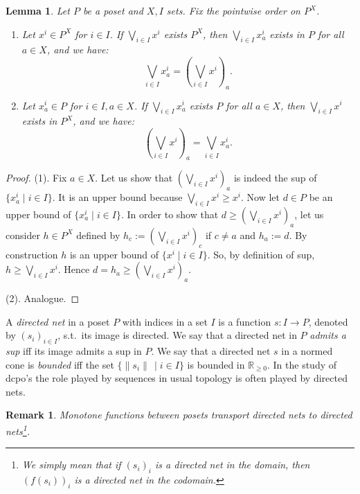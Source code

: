\documentclass[submission,copyright,creativecommons]{eptcs}
\newtheorem{Lemma}[theorem]{Lemma}
\newtheorem{Remark}[theorem]{Remark}
\newcommand{\R}{\mathbb{R}}
\newcommand{\set}[1]{\{#1\}}
\newcommand{\norm}[1]{\lVert #1 \lVert}
\begin{document}
\begin{Lemma}\label{lm:sup=sup}
 Let $P$ be a poset and $X, I$ sets. Fix the pointwise order on $P^X$.
 \begin{enumerate}
  \item Let $x^i\in P^X$ for $i\in I$.
  If $\bigvee\limits_{i\in I} x^i$ exists $P^X$, then $\bigvee\limits_{i\in I} x^i_a$ exists in $P$ for all $a\in X$, and we have: \[\bigvee\limits_{i\in I} x^i_a=\left(\bigvee\limits_{i\in I} x^i\right)_a.\]
 \item Let $x^i_a\in P$ for $i\in I,a\in X$.
  If $\bigvee\limits_{i\in I} x^i_a$ exists $P$ for all $a\in X$, then $\bigvee\limits_{i\in I} x^i$ exists in $P^X$, and we have: \[\left(\bigvee\limits_{i\in I} x^i\right)_a=\bigvee\limits_{i\in I} x^i_a.\]
 \end{enumerate}
\end{Lemma}
\begin{proof}
 (1). Fix $a\in X$. Let us show that $\left(\bigvee\limits_{i\in I} x^i\right)_a$ is indeed the sup of $\set{x^i_a\mid i\in I}$.
 It is an upper bound because $\bigvee\limits_{i\in I} x^i\geq x^i$.
 Now let $d\in P$ be an upper bound of $\set{x^i_a\mid i\in I}$. In order to show that $d\geq \left(\bigvee\limits_{i\in I} x^i\right)_a$, let us consider $h\in P^X$ defined by $h_c:=\left(\bigvee\limits_{i\in I} x^i\right)_c$ if $c\neq a$ and $h_a:=d$.
 By construction $h$ is an upper bound of $\set{x^i\mid i\in I}$.
 So, by definition of sup, $h\geq \bigvee\limits_{i\in I} x^i$.
 Hence $d=h_a\geq\left(\bigvee\limits_{i\in I} x^i\right)_a$.
 
 (2). Analogue.
\end{proof}

A \emph{directed net} in a poset $P$ with indices in a set $I$ is a function $s:I\to P$, denoted by $(s_i)_{i\in I}$, s.t.\ its image is directed.
We say that a directed net in $P$ \emph{admits a sup} iff its image admits a sup in $P$.
We say that a directed net $s$ in a normed cone is \emph{bounded} iff the set $\set{\norm{s_i}\,\mid i\in I}$ is bounded in $\R_{\geq 0}$.
In the study of dcpo's the role played by sequences in usual topology is often played by directed nets.

\begin{Remark}\label{rmk:trivial}
 Monotone functions between posets transport directed nets to directed nets\footnote{We simply mean that if $(s_i)_i$ is a directed net in the domain, then $(f(s_i))_i$ is a directed net in the codomain.}.
\end{Remark}
\end{document}
